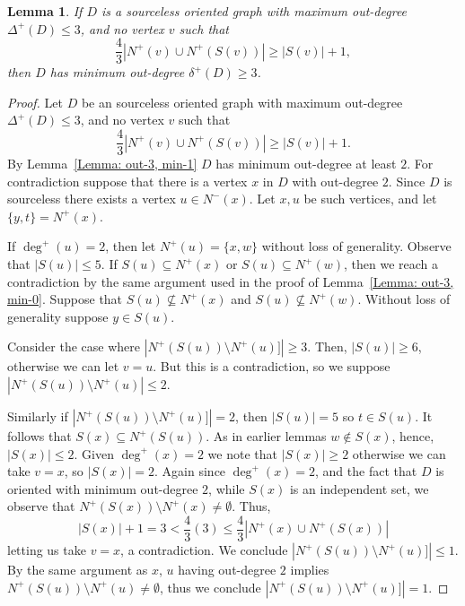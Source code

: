 \documentclass[12pt]{article}
\newtheorem{lemma}[theorem]{Lemma}
\theoremstyle{definition}
\begin{document}
\begin{lemma}\label{Lemma: out-3, min-2}
   If $D$ is a sourceless oriented graph with maximum out-degree $\Delta^+(D)\leq 3$,
   and no vertex $v$ such that
    \[
    \frac{4}{3}|N^+(v) \cup N^+(S(v))| \geq |S(v)|+1,
    \]
    then $D$ has minimum out-degree $\delta^+(D)\geq 3$.
\end{lemma}

\begin{proof}
    Let $D$ be an sourceless oriented graph with maximum out-degree $\Delta^+(D)\leq 3$,
   and no vertex $v$ such that 
    \[
    \frac{4}{3}|N^+(v) \cup N^+(S(v))| \geq |S(v)|+1.
    \]
    By Lemma~\ref{Lemma: out-3, min-1} $D$ has minimum out-degree at least $2$.
    For contradiction suppose that there is a vertex $x$ in $D$ with out-degree $2$.
    Since $D$ is sourceless there exists a vertex $u \in N^-(x)$.
    Let $x,u$ be such vertices, and let $\{y,t\} = N^+(x)$.

    If $\deg^+(u) = 2$, 
    then let $N^+(u) = \{x,w\}$ without loss of generality.
    Observe that $|S(u)|\leq 5$.
    If $S(u) \subseteq N^+(x)$ or $S(u) \subseteq N^+(w)$, then we reach a contradiction by the same argument used in the proof of 
    Lemma~\ref{Lemma: out-3, min-0}.
    Suppose that $S(u) \not\subseteq N^+(x)$ and $S(u) \not\subseteq N^+(w)$.
    Without loss of generality suppose $y \in S(u)$.

    Consider the case where $|N^+(S(u))\setminus N^+(u)]| \geq 3$.
    Then, $|S(u)|\geq 6$, otherwise we can let $v = u$.
    But this is a contradiction, so we suppose $|N^+(S(u))\setminus N^+(u)| \leq 2$.

    Similarly if $|N^+(S(u))\setminus N^+(u)]| = 2$, then $|S(u)| = 5$ so $t \in S(u)$.
    It follows that $S(x)\subseteq N^+(S(u))$.
    As in earlier lemmas $w \notin S(x)$, hence, $|S(x)|\leq 2$.
    Given $\deg^+(x) = 2$ we note that $|S(x)| \geq 2$ otherwise we can take $v =x$, so $|S(x)| = 2$.
    Again since $\deg^+(x) = 2$, and the fact that $D$ is oriented with minimum out-degree $2$, while $S(x)$ is an independent set,
    we observe that $N^+(S(x))\setminus N^+(x) \neq \emptyset$.
    Thus, 
    \[
    |S(x)|+1 = 3 < \frac{4}{3}(3)\leq \frac{4}{3}|N^+(x)\cup N^+(S(x))|
    \]
    letting us take $v = x$, a contradiction.
    We conclude $|N^+(S(u))\setminus N^+(u)]| \leq 1$.
    By the same argument as $x$, $u$ having out-degree $2$ implies $N^+(S(u))\setminus N^+(u) \neq \emptyset$,
    thus we conclude $|N^+(S(u))\setminus N^+(u)]| = 1$.


\end{proof}
\end{document}
